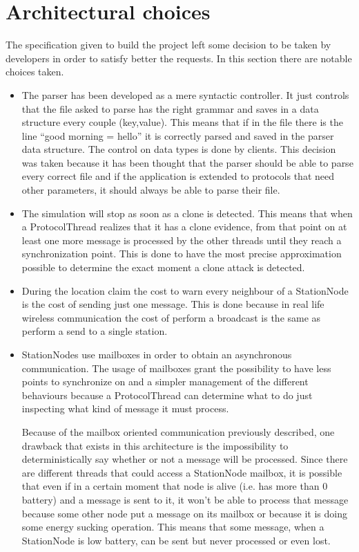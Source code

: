 \section{Architectural choices}
The specification given to build the project left some decision to be taken by
developers in order to satisfy better the requests. In this section there are 
notable choices taken.
\begin{itemize}
  \item The parser has been developed as a mere syntactic controller. It just
  controls that the file asked to parse has the right grammar and saves in a 
  data structure every couple (key,value). This means that if in the file there
  is the line ``good morning = hello'' it is correctly parsed and saved in the
  parser data structure. The control on data types is done 
  by clients. This decision was taken because it has been thought that the 
  parser should be able to parse every correct file and if the application is 
  extended to protocols that need other parameters, it should always be able to
  parse their file.
  \item The simulation will stop as soon as a clone is detected. This means 
  that when a ProtocolThread realizes that it has a clone evidence, from that
  point on at least one more message is processed by the other threads until
  they reach a synchronization point. This is done to have the most precise
  approximation possible to determine the exact moment a clone attack is detected.
  \item During the location claim the cost to warn every neighbour of a 
  StationNode is the cost of sending just one message. This is done because in
  real life wireless communication the cost of perform a broadcast is the same
  as perform a send to a single station.
  \item StationNodes use mailboxes in order to obtain an asynchronous
  communication. The usage of mailboxes grant the possibility to have less 
  points to synchronize on and a simpler management of the different 
  behaviours because a ProtocolThread can determine what to do just inspecting 
  what kind of message it must process.
  
  Because of the mailbox oriented communication previously described, one
  drawback that exists in this architecture is the impossibility to 
  deterministically say whether or not a message will be processed. Since there
  are different threads that could access a StationNode mailbox, it is possible
  that even if in a certain moment that node is alive (i.e. has more than 0 
  battery) and a message is sent to it, 
  it won't be able to process that message because some other node put
  a message on its mailbox or because it is doing some energy sucking operation. 
  This means that some message, when a StationNode is low battery, can be sent 
  but never processed or even lost.
  

\end{itemize}
